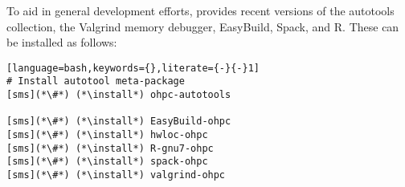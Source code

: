 To aid in general development efforts, \OHPC{} provides recent versions of the \GNU{}
autotools collection, the Valgrind memory debugger, EasyBuild, Spack, and R. These can be installed as follows:

\begin{lstlisting}[language=bash,keywords={},literate={-}{-}1]
# Install autotool meta-package
[sms](*\#*) (*\install*) ohpc-autotools

[sms](*\#*) (*\install*) EasyBuild-ohpc
[sms](*\#*) (*\install*) hwloc-ohpc
[sms](*\#*) (*\install*) R-gnu7-ohpc            
[sms](*\#*) (*\install*) spack-ohpc
[sms](*\#*) (*\install*) valgrind-ohpc
\end{lstlisting}
